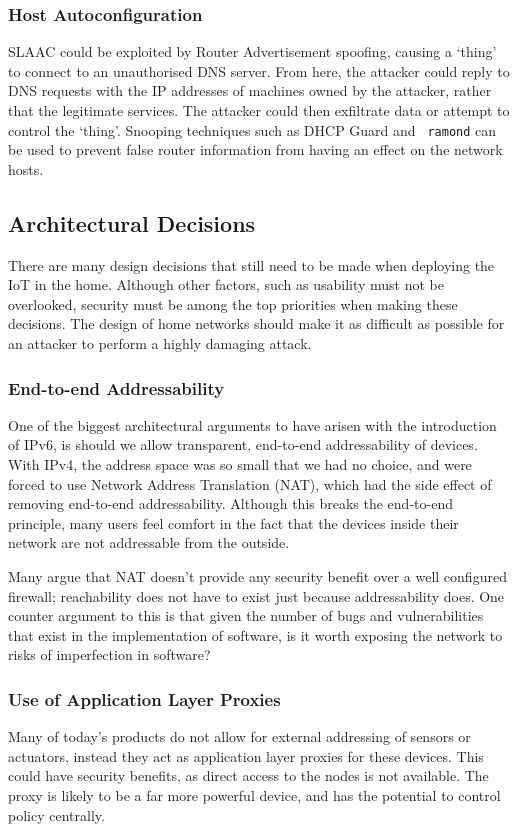 \documentclass[10pt,journal,compsoc]{IEEEtran}
\begin{document}
\subsubsection{Host Autoconfiguration}
SLAAC could be exploited by Router Advertisement spoofing, causing a `thing' to
connect to an unauthorised DNS server. From here, the attacker could reply to
DNS requests with the IP addresses of machines owned by the attacker, rather
that the legitimate services. The attacker could then exfiltrate data or
attempt to control the `thing'. Snooping techniques such as DHCP Guard and {\tt
ramond} can be used to prevent false router information from having an effect
on the network hosts.  

\subsection{Architectural Decisions}
There are many design decisions that still need to be made when deploying the
IoT in the home. Although other factors, such as usability must not be
overlooked, security must be among the top priorities when making these
decisions.  The design of home networks should make it as difficult as possible
for an attacker to perform a highly damaging attack. 

\subsubsection{End-to-end Addressability}
One of the biggest architectural arguments to have arisen with the introduction
of IPv6, is should we allow transparent, end-to-end addressability of devices.
With IPv4, the address space was so small that we had no choice, and were
forced to use Network Address Translation (NAT), which had the side effect of
removing end-to-end addressability. Although this breaks the end-to-end
principle, many users feel comfort in the fact that the devices inside their
network are not addressable from the outside.  

Many argue that NAT doesn't provide any security benefit over a well configured
firewall; reachability does not have to exist just because addressability does.
One counter argument to this is that given the number of bugs and
vulnerabilities that exist in the implementation of software, is it worth
exposing the network to risks of imperfection in software?

\subsubsection{Use of Application Layer Proxies}
Many of today's products do not allow for external addressing of sensors or
actuators, instead they act as application layer proxies for these devices.
This could have security benefits, as direct access to the nodes is not
available. The proxy is likely to be a far more powerful device, and has the
potential to control policy centrally. 
\end{document}
